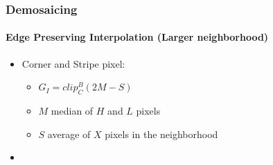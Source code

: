 \documentclass{beamer}
\begin{document}
\begin{frame}
\frametitle{Demosaicing}
\framesubtitle{Edge Preserving Interpolation \small{(Larger neighborhood)}}
\begin{itemize}
\item Corner and Stripe pixel:
\begin{itemize}
\item $G_{I} = clip^{B}_{C}(2M -S)$
\item $M$ median of $H$ and $L$ pixels 
\item $S$ average of $X$ pixels in the neighborhood
\end{itemize}
\item[]
\end{itemize}
\end{frame}
\end{document}
